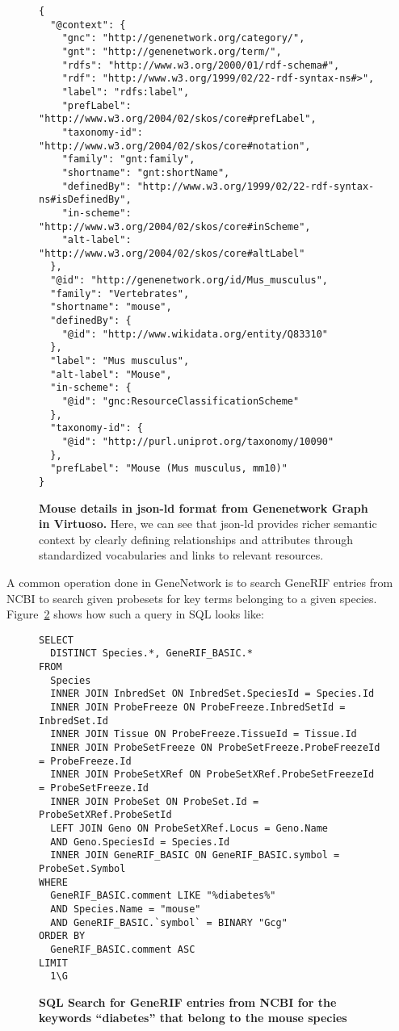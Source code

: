 \begin{figure}[H]
\centering
\begin{verbatim}
{
  "@context": {
    "gnc": "http://genenetwork.org/category/",
    "gnt": "http://genenetwork.org/term/",
    "rdfs": "http://www.w3.org/2000/01/rdf-schema#",
    "rdf": "http://www.w3.org/1999/02/22-rdf-syntax-ns#>",
    "label": "rdfs:label",
    "prefLabel": "http://www.w3.org/2004/02/skos/core#prefLabel",
    "taxonomy-id": "http://www.w3.org/2004/02/skos/core#notation",
    "family": "gnt:family",
    "shortname": "gnt:shortName",
    "definedBy": "http://www.w3.org/1999/02/22-rdf-syntax-ns#isDefinedBy",
    "in-scheme": "http://www.w3.org/2004/02/skos/core#inScheme",
    "alt-label": "http://www.w3.org/2004/02/skos/core#altLabel"
  },
  "@id": "http://genenetwork.org/id/Mus_musculus",
  "family": "Vertebrates",
  "shortname": "mouse",
  "definedBy": {
    "@id": "http://www.wikidata.org/entity/Q83310"
  },
  "label": "Mus musculus",
  "alt-label": "Mouse",
  "in-scheme": {
    "@id": "gnc:ResourceClassificationScheme"
  },
  "taxonomy-id": {
    "@id": "http://purl.uniprot.org/taxonomy/10090"
  },
  "prefLabel": "Mouse (Mus musculus, mm10)"
}
\end{verbatim}
\caption[SPARQL Results: Fetching mouse details]{\textbf{Mouse details in json-ld format from Genenetwork Graph in Virtuoso.}  Here, we can see that json-ld provides richer semantic context by clearly defining relationships and attributes through standardized vocabularies and links to relevant resources.}\label{figure:mouse-sparql-results}
\end{figure}

A common operation done in GeneNetwork is to search GeneRIF entries from NCBI to search given probesets for key terms belonging to a given species.   Figure~\ref{sql:search-ncbi} shows how such a query in SQL looks like:

\begin{figure}[H]
\centering
\begin{verbatim}
SELECT 
  DISTINCT Species.*, GeneRIF_BASIC.* 
FROM 
  Species
  INNER JOIN InbredSet ON InbredSet.SpeciesId = Species.Id 
  INNER JOIN ProbeFreeze ON ProbeFreeze.InbredSetId = InbredSet.Id 
  INNER JOIN Tissue ON ProbeFreeze.TissueId = Tissue.Id 
  INNER JOIN ProbeSetFreeze ON ProbeSetFreeze.ProbeFreezeId = ProbeFreeze.Id 
  INNER JOIN ProbeSetXRef ON ProbeSetXRef.ProbeSetFreezeId = ProbeSetFreeze.Id 
  INNER JOIN ProbeSet ON ProbeSet.Id = ProbeSetXRef.ProbeSetId 
  LEFT JOIN Geno ON ProbeSetXRef.Locus = Geno.Name 
  AND Geno.SpeciesId = Species.Id
  INNER JOIN GeneRIF_BASIC ON GeneRIF_BASIC.symbol = ProbeSet.Symbol 
WHERE 
  GeneRIF_BASIC.comment LIKE "%diabetes%" 
  AND Species.Name = "mouse"
  AND GeneRIF_BASIC.`symbol` = BINARY "Gcg"
ORDER BY 
  GeneRIF_BASIC.comment ASC
LIMIT 
  1\G
\end{verbatim}
\caption[SQL: Search for GeneRIF entries from NCBI for the keyword ``diabetes'' that belongs to the mouse species]{\textbf{SQL Search for GeneRIF entries from NCBI for the keywords ``diabetes'' that belong to the mouse species}}\label{sql:search-ncbi}
\end{figure}

